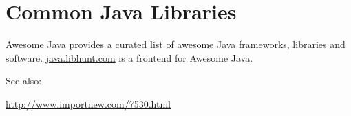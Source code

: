 \section{Common Java Libraries}


\href{https://github.com/akullpp/awesome-java}{Awesome Java} provides a curated
list of awesome Java frameworks, libraries and software.
\href{https://java.libhunt.com/}{java.libhunt.com} is a frontend for Awesome
Java.










See also:

\url{ http://www.importnew.com/7530.html}

